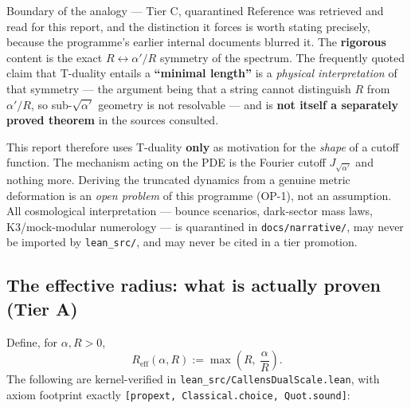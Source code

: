 \documentclass[11pt,a4paper]{article}
\newcommand{\tA}{\textcolor{TierA}{\textbf{Tier A}}}
\newcommand{\Reff}{R_{\mathrm{eff}}}
\theoremstyle{definition}
\theoremstyle{plain}
\begin{document}
\begin{warnbox}{Boundary of the analogy --- Tier C, quarantined}
Reference \cite{giveon-porrati-rabinovici} was retrieved and read for this report, and the
distinction it forces is worth stating precisely, because the programme's earlier internal
documents blurred it. The \textbf{rigorous} content is the exact $R\leftrightarrow\alpha'/R$
symmetry of the spectrum. The frequently quoted claim that T-duality entails a
\textbf{``minimal length''} is a \emph{physical interpretation} of that symmetry --- the
argument being that a string cannot distinguish $R$ from $\alpha'/R$, so sub-$\sqrt{\alpha'}$
geometry is not resolvable --- and is \textbf{not itself a separately proved theorem} in the
sources consulted.

This report therefore uses T-duality \textbf{only} as motivation for the \emph{shape} of a
cutoff function. The mechanism acting on the PDE is the Fourier cutoff $J_{\sqrt{\alpha'}}$
and nothing more. Deriving the truncated dynamics from a genuine metric deformation is an
\emph{open problem} of this programme (OP-1), not an assumption. All cosmological
interpretation --- bounce scenarios, dark-sector mass laws, K3/mock-modular numerology --- is
quarantined in \texttt{docs/narrative/}, may never be imported by \texttt{lean\_src/}, and may
never be cited in a tier promotion.
\end{warnbox}

\subsection{The effective radius: what is actually proven (\tA{})}

Define, for $\alpha,R>0$,
\begin{equation}
\Reff(\alpha,R) := \max\!\left(R,\ \frac{\alpha}{R}\right).
\end{equation}
The following are kernel-verified in \texttt{lean\_src/CallensDualScale.lean}, with axiom
footprint exactly \texttt{[propext, Classical.choice, Quot.sound]}:
\end{document}

